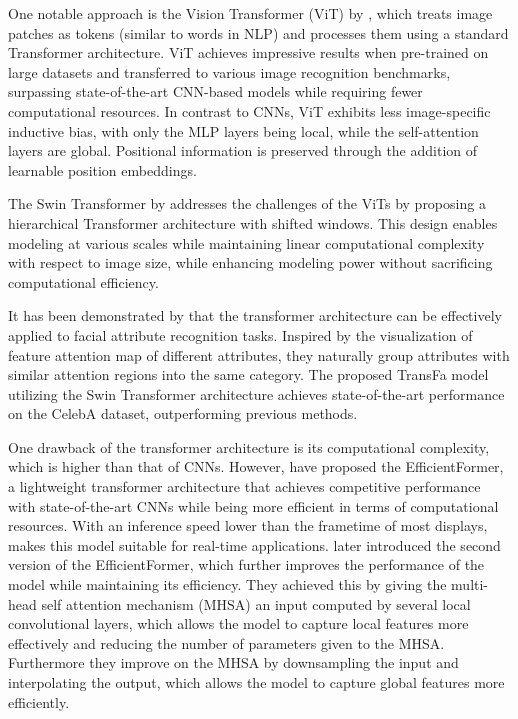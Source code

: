\documentclass{article}
\begin{document}
One notable approach is the Vision Transformer (ViT) by \citet{DBLP:journals/corr/abs-2010-11929}, which treats image patches as tokens (similar to words in NLP) and processes them using a standard Transformer architecture.
ViT achieves impressive results when pre-trained on large datasets and transferred to various image recognition benchmarks, surpassing state-of-the-art CNN-based models while requiring fewer computational resources.
In contrast to CNNs, ViT exhibits less image-specific inductive bias, with only the MLP layers being local, while the self-attention layers are global.
Positional information is preserved through the addition of learnable position embeddings. 

The Swin Transformer by \citet{DBLP:journals/corr/abs-2103-14030} addresses the challenges of the ViTs by proposing a hierarchical Transformer architecture with shifted windows.
This design enables modeling at various scales while maintaining linear computational complexity with respect to image size, while enhancing modeling power without sacrificing computational efficiency.

It has been demonstrated by \citet{liu2022transfa} that the transformer architecture can be effectively applied to facial attribute recognition tasks.
Inspired by the visualization of feature attention map of different attributes, they naturally group attributes with similar attention regions into the same category.
The proposed TransFa model utilizing the Swin Transformer architecture achieves state-of-the-art performance on the CelebA dataset, outperforming previous methods.

One drawback of the transformer architecture is its computational complexity, which is higher than that of CNNs.
However, \citet{li2022efficientformer} have proposed the EfficientFormer, a lightweight transformer architecture that achieves competitive performance with state-of-the-art CNNs while being more efficient in terms of computational resources.
With an inference speed lower than the frametime of most displays, makes this model suitable for real-time applications.
\citet{li2022rethinking} later introduced the second version of the EfficientFormer, which further improves the performance of the model while maintaining its efficiency.
They achieved this by giving the multi-head self attention mechanism (MHSA) an input computed by several local convolutional layers, which allows the model to capture local features more effectively and reducing the number of parameters given to the MHSA.
Furthermore they improve on the MHSA by downsampling the input and interpolating the output, which allows the model to capture global features more efficiently.
\end{document}
